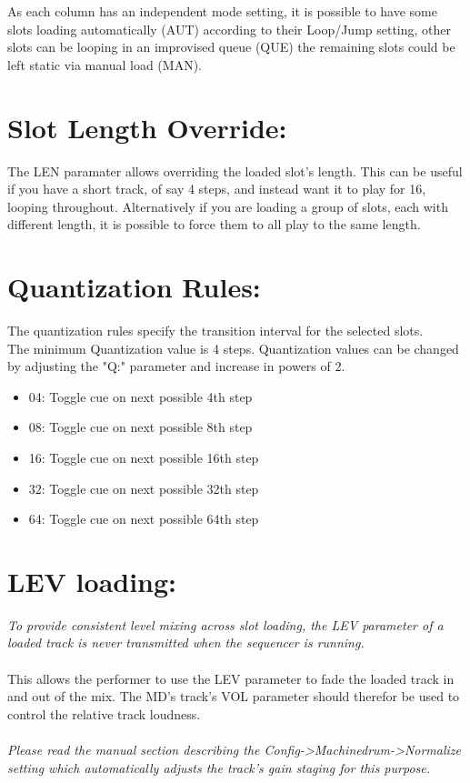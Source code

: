 As each column has an independent mode setting, it is possible to have some slots loading automatically (AUT) according to their Loop/Jump setting, other slots can be looping in an improvised queue (QUE) the remaining slots could be left static via manual load (MAN).

\section{Slot Length Override:}
The LEN paramater allows overriding the loaded slot's length. This can be useful if you have a short track, of say 4 steps, and instead want it to play for 16, looping throughout. Alternatively if you are loading a group of slots, each with different length, it is possible to force them to all play to the same length.

\section{Quantization Rules:}
The quantization rules specify the transition interval for the selected slots.\\
The minimum Quantization value is 4 steps. Quantization values can be changed by adjusting the "Q:" parameter and increase in powers of 2.
\begin{itemize}
\item 04: Toggle cue on next possible 4th step
\item 08: Toggle cue on next possible 8th step 
\item 16: Toggle cue on next possible 16th step 
\item 32: Toggle cue on next possible 32th step 
\item 64: Toggle cue on next possible 64th step
\end{itemize}

\section{LEV loading:}
\textit{To provide consistent level mixing across slot loading, the LEV parameter of a loaded track is never transmitted when the sequencer is running.}\\\\This allows the performer to use the LEV parameter to fade the loaded track in and out of the mix. The MD's track's VOL parameter should therefor be used to control the relative track loudness.\\\\
\textit{Please read the manual section describing the Config->Machinedrum->Normalize setting which automatically adjusts the track's gain staging for this purpose.}

